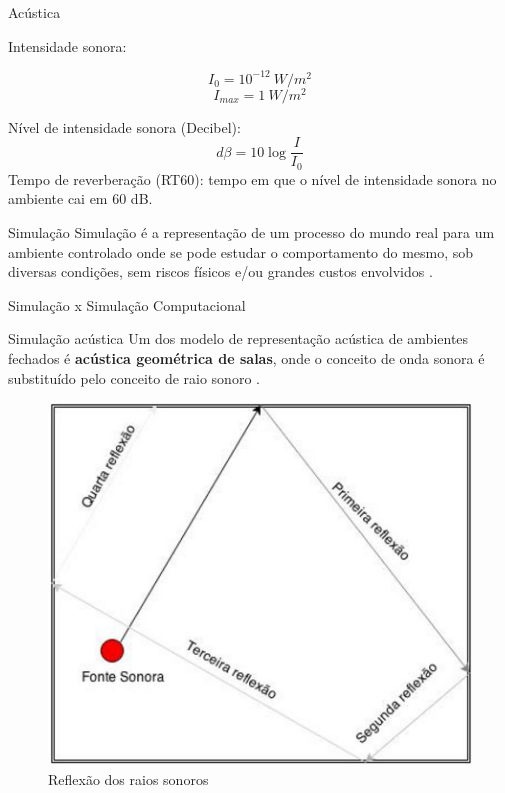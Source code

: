 \begin{frame}[allowframebreaks]{Acústica}

Intensidade sonora:
\begin{large}
\[I_{0} = 10^{-12}~W/m^{2}\]
\[I_{max} = 1~W/m^{2}\]
\end{large}

Nível de intensidade sonora (Decibel):
{\large \[d\beta = 10 \log \frac{I}{I_{0}}\]}
Tempo de reverberação (RT60): tempo em que o nível de intensidade sonora no ambiente cai em 60 dB.
\end{frame}


\begin{frame}{Simulação}
Simulação é a representação de um processo do mundo real para um ambiente controlado onde se pode estudar o comportamento do mesmo, sob diversas condições, sem riscos físicos e/ou grandes custos envolvidos \cite{torga}.
\linebreak
\linebreak
\begin{center}
Simulação x Simulação Computacional
\end{center}
\end{frame}


\begin{frame}{Simulação acústica}
Um dos modelo de representação acústica de ambientes fechados é \textbf{acústica geométrica de salas}, onde o conceito de onda sonora é substituído pelo conceito de raio sonoro \cite{torres}.

  \begin{figure}[t]
    \centering
    \includegraphics[height=\dimexpr7\textheight/14\relax]{figuras/reflexoes}
    \caption{Reflexão dos raios sonoros}
  \end{figure}
  
\end{frame}
